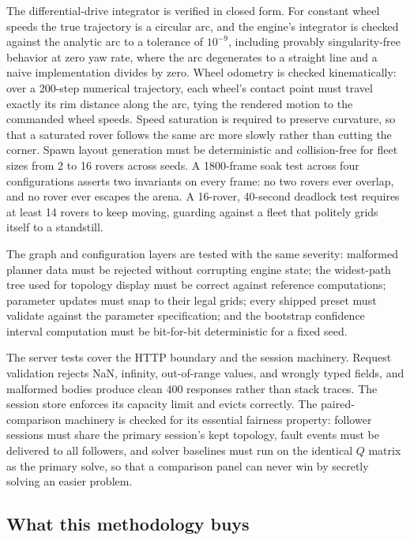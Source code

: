 The differential-drive integrator is verified in closed form. For constant
wheel speeds the true trajectory is a circular arc, and the engine's
integrator is checked against the analytic arc to a tolerance of
$10^{-9}$, including provably singularity-free behavior at zero yaw rate,
where the arc degenerates to a straight line and a naive implementation
divides by zero. Wheel odometry is checked kinematically: over a 200-step
numerical trajectory, each wheel's contact point must travel exactly its
rim distance along the arc, tying the rendered motion to the commanded
wheel speeds. Speed saturation is required to preserve curvature, so that a
saturated rover follows the same arc more slowly rather than cutting the
corner. Spawn layout generation must be deterministic and collision-free
for fleet sizes from 2 to 16 rovers across seeds. A 1800-frame soak test
across four configurations asserts two invariants on every frame: no two
rovers ever overlap, and no rover ever escapes the arena. A 16-rover,
40-second deadlock test requires at least 14 rovers to keep moving,
guarding against a fleet that politely grids itself to a standstill.

The graph and configuration layers are tested with the same severity:
malformed planner data must be rejected without corrupting engine state;
the widest-path tree used for topology display must be correct against
reference computations; parameter updates must snap to their legal grids;
every shipped preset must validate against the parameter specification; and
the bootstrap confidence interval computation must be bit-for-bit
deterministic for a fixed seed.

The server tests cover the HTTP boundary and the session machinery. Request
validation rejects NaN, infinity, out-of-range values, and wrongly typed
fields, and malformed bodies produce clean 400 responses rather than stack
traces. The session store enforces its capacity limit and evicts correctly.
The paired-comparison machinery is checked for its essential fairness
property: follower sessions must share the primary session's kept topology,
fault events must be delivered to all followers, and solver baselines must
run on the identical $Q$ matrix as the primary solve, so that a comparison
panel can never win by secretly solving an easier problem.

\subsection{What this methodology buys}

